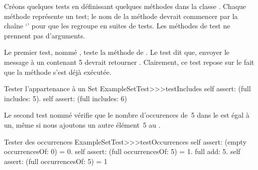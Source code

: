 \documentclass[a4paper,10pt,twoside]{book}
\begin{document}
Créons quelques tests en définissant quelques méthodes dans la classe .
Chaque méthode représente un test;
le nom de la méthode devrait commencer par la chaîne `' pour que \sunit les regroupe en suites de tests.
Les méthodes de test ne prennent pas d'arguments.


Le premier test, nommé , teste la méthode  de . Le test dit que, envoyer le message  à un  contenant 5 devrait retourner . Clairement, ce test repose sur le fait que la méthode  s'est déjà exécutée.


\begin{method}[testIncludes]{Tester l'appartenance à un Set}
ExampleSetTest>>>testIncludes
	self assert: (full includes: 5).
	self assert: (full includes: 6)
\end{method}

Le second test nommé  vérifie que le nombre d'occurences de~5 dans le   est égal à un, même si nous ajoutons un autre élément~5 au .

\begin{method}[testOccurrences]{Tester des occurrences}
ExampleSetTest>>>testOccurrences
	self assert: (empty occurrencesOf: 0) = 0.
	self assert: (full occurrencesOf: 5) = 1.
	full add: 5.
	self assert: (full occurrencesOf: 5) = 1
\end{method}
\end{document}
